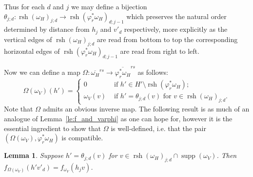 \documentclass{amsart}
\newtheorem{lemma}[theorem]{Lemma}
\newcommand{\supp}{\operatorname{supp}}
\newcommand{\rsh}{\operatorname{rsh}}
\begin{document}
 Thus for each $d$ and $j$ we may define a bijection $\theta_{j;d}:\rsh(\omega_H)_{j;d}\to\rsh(\varphi^*_r\omega_H)_{d;j-1}$ which preserves the natural order determined by distance from $h_j$ and $v'_d$ respectively, more explicitly as the vertical edges of $\rsh(\omega_H)_{j;d}$ are read from bottom to top the corresponding horizontal edges of $\rsh(\varphi^*_r\omega_H)_{d;j-1}$ are read from right to left.

 Now we can define a map $\Omega:\overline{\omega_H}^{rs}\to\overline{\varphi_r^*\omega_H}^{rs}$ as follows:
 \[\Omega(\omega_V)(h')=\begin{cases}
                          0 & \text{ if $h'\in H'\setminus\rsh(\varphi^*_r\omega_H)$;}\\
                          \omega_V(v) & \text{ if $h'=\theta_{j;d}(v)$ for $v\in\rsh(\omega_H)_{j;d}$.}
                         \end{cases}\]
 Note that $\Omega$ admits an obvious inverse map.  The following result is as much of an analogue of Lemma~\ref{le:f_and_varphi} as one can hope for, however it is the essential ingredient to show that $\Omega$ is well-defined, i.e. that the pair $(\Omega(\omega_V),\varphi^*_r\omega_H)$ is compatible.
 \begin{lemma}\label{le:f_and_Omega}
  Suppose $h'=\theta_{j;d}(v)$ for $v\in\rsh(\omega_H)_{j;d}\cap\supp(\omega_V)$. Then $f_{\Omega(\omega_V)}(h'v'_d)=f_{\omega_V}(h_jv)$.
 \end{lemma}
\end{document}
